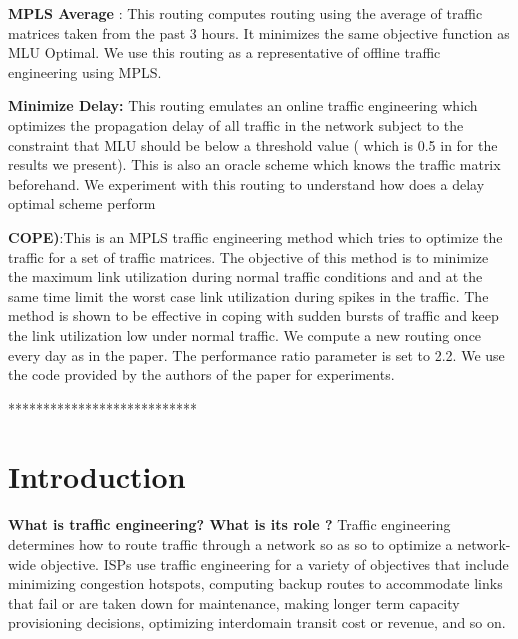\textbf{MPLS Average }:
This routing computes routing using the average of traffic matrices taken from the past 3 hours. It minimizes the same objective function as MLU Optimal. We use this routing as a representative of offline traffic engineering using MPLS.

\textbf{Minimize Delay:} This routing emulates an online traffic engineering which optimizes the propagation delay of all traffic in the network subject to the constraint that MLU should be below a threshold value ( which is 0.5 in for the results we present). This is also an oracle scheme which knows the traffic matrix beforehand. We experiment with this routing to understand how does a delay optimal scheme perform 

%
%
%

\textbf{COPE)}:This is an MPLS traffic engineering method which tries to optimize the traffic for a set of traffic matrices. The objective of this method is to minimize the maximum link utilization during normal traffic conditions and and at the same time limit the worst case link utilization during spikes in the traffic. The method is shown to be effective in coping with sudden bursts of traffic and keep the link utilization low under normal traffic. We compute a new routing once every day as in the paper\cite{COPE}. The performance ratio parameter is set to 2.2. We use the code provided by the authors of the paper for experiments. 



***************************

\section{Introduction}

\textbf{What is traffic engineering? What is its role ?}
Traffic engineering determines how to route traffic through a network so as so to optimize a network-wide objective. ISPs use traffic engineering for a variety of objectives that include minimizing congestion hotspots, computing backup routes to accommodate links that fail or are taken down for maintenance, making longer term capacity provisioning decisions, optimizing interdomain transit cost or revenue, and so on. 

